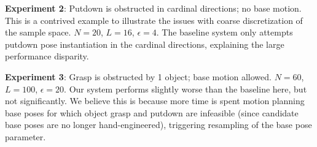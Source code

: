 \textbf{Experiment 2}: Putdown is obstructed in cardinal directions; no base motion.
This is a contrived example to illustrate the issues with coarse discretization of the sample space.
$N = 20$, $L = 16$, $\epsilon = 4$. The baseline system only attempts putdown pose instantiation in the
cardinal directions, explaining the large performance disparity.

\textbf{Experiment 3}: Grasp is obstructed by 1 object; base motion allowed.
$N = 60$, $L = 100$, $\epsilon = 20$. Our system performs slightly worse than the baseline
here, but not significantly. We believe this is because more time is spent motion planning
base poses for which object grasp and putdown are infeasible (since candidate base poses are no
longer hand-engineered), triggering resampling of the base pose parameter.
